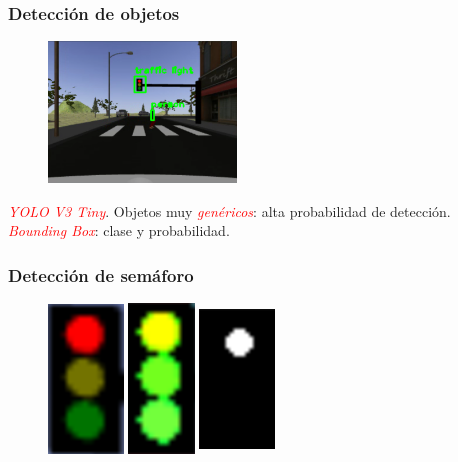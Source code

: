 \documentclass{beamer}
\begin{document}
\begin{frame}
	\frametitle{Detección de objetos}
	\begin{figure}
		\centering
		\includegraphics[width=5cm]{figs/darknetSimulator}
	\end{figure}
	\begin{outline}
		\1 \textcolor{red}{\textit{YOLO V3 Tiny}}.
		\1 Objetos muy \textcolor{red}{\textit{genéricos}}: alta probabilidad de detección.
		\1 \textcolor{red}{\textit{Bounding Box}}: clase y probabilidad.
	\end{outline}
\end{frame}

\begin{frame}
	\frametitle{Detección de semáforo}
	\begin{figure}
		\centering
		\includegraphics[width=2cm, height=4cm]{figs/cropped}\hspace{2cm}\includegraphics[width=2cm, height=4cm]{figs/hsv}\hspace{2cm}\includegraphics[width=2cm,
			height=4cm]{figs/mask}
	\end{figure}
\end{frame}
\end{document}
